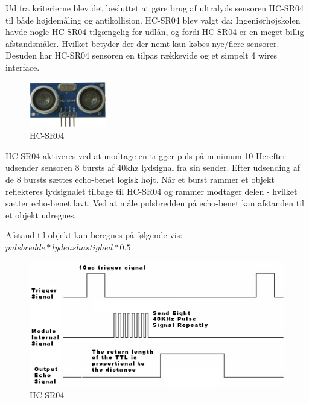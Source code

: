 \vspace{0.5cm}

Ud fra kriterierne blev det besluttet at gøre brug af ultralyds sensoren HC-SR04 til både højdemåling og antikollision. HC-SR04 blev valgt da: Ingeniørhøjskolen havde nogle HC-SR04 tilgængelig for udlån, og fordi HC-SR04 er en meget billig afstandsmåler. Hvilket betyder der der nemt kan købes nye/flere sensorer. Desuden har HC-SR04 sensoren en tilpas rækkevide og et simpelt 4 wires interface. 

\begin{figure}[H]
\centering
\includegraphics[width=0.3\textwidth]{Billeder/Afstandsmaler/ultra_sensor.png}
\caption{HC-SR04}
\label{fig:HC-SR04}
\end{figure}

\newpage

HC-SR04 aktiveres ved at modtage en trigger puls på minimum 10 
Herefter udsender sensoren 8 bursts af 40khz lydsignal fra sin sender. Efter udsending af de 8 bursts sættes echo-benet logisk højt. Når et burst rammer et objekt reflekteres lydsignalet tilbage til HC-SR04 og rammer modtager delen - hvilket sætter echo-benet lavt. Ved at måle pulsbredden på echo-benet kan afstanden til et objekt udregnes. 

Afstand til objekt kan beregnes på følgende vis: $pulsbredde * lydenshastighed * 0.5$

\vspace{0.2cm}

\begin{figure}[H]
\centering
\includegraphics[width=1\textwidth]{Billeder/Afstandsmaler/ultra_schematic.png}
\caption{HC-SR04}
\label{fig:HC-SR04}
\end{figure}

\vspace{2cm}








